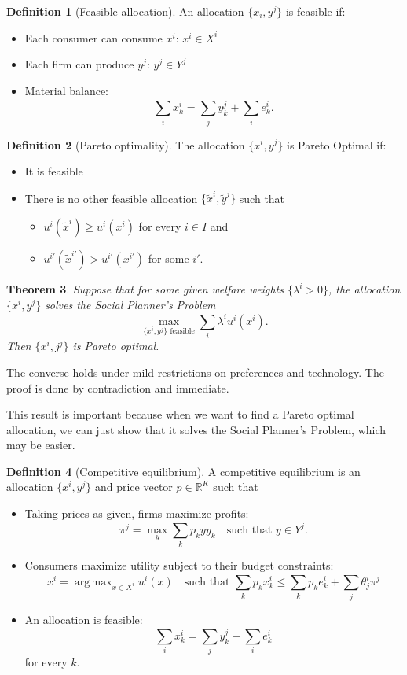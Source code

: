 \documentclass{tufte-handout}
\newcommand*\R{\mathbb{R}}
\DeclareMathOperator*{\argmax}{arg\,max} %
\newtheorem{thm}{Theorem}[subsection]
\theoremstyle{definition}
\newtheorem{defn}[thm]{Definition}
\begin{document}
\begin{defn}[Feasible allocation]
	An allocation $\{x_i, y^j\}$ is feasible if:
	\begin{itemize}
		\item Each consumer can consume $x^i$: $x^i \in X^i$
		\item Each firm can produce $y^j$: $y^j \in Y^j$
		\item Material balance: \[
			\sum\limits_{i}^{} x_k^i = \sum\limits_{j}^{} y_k^j + \sum\limits_{i}^{} e_k^i.
		\] 
	\end{itemize}
\end{defn}

\begin{defn}[Pareto optimality]
	The allocation $\{x^i, y^j\}$ is Pareto Optimal if:
	\begin{itemize}
		\item It is feasible
		\item There is no other feasible allocation $\{\tilde{x}^i, \tilde{y}^j\}$ such that
			\begin{itemize}
				\item $u^i(\tilde{x}^i) \ge u^i(x^i)$ for every $i \in I$ and
				\item $u^{i'}(\tilde{x}^{i'}) > u^{i'}(x^{i'})$ for some $i'$.
			\end{itemize}
	\end{itemize}
\end{defn}

\begin{thm}
	Suppose that for some given welfare weights $\{\lambda^i > 0\}$, the allocation $\{x^i, y^j\}$ solves the Social Planner's Problem \[
		\max_{\{x^i, y^j\} \text{ feasible}} \sum\limits_{i}^{} \lambda^i u^i (x^i)
	.\] Then $\{x^i, j^j\}$ is Pareto optimal.
\end{thm}
The converse holds under mild restrictions on preferences and technology.
The proof is done by contradiction and immediate.

This result is important because when we want to find a Pareto optimal allocation, we can just show that it solves the Social Planner's Problem, which may be easier.

\begin{defn}[Competitive equilibrium]
	A competitive equilibrium is an allocation $\{x^i, y^j\}$ and price vector $p \in \R^K$ such that
	\begin{itemize}
		\item Taking prices as given, firms maximize profits: \[
			\pi^j = \max_{y} \sum\limits_{k}^{} p_ky y_k \quad \text{such that } y \in Y^j
		.\] 
	\item Consumers maximize utility subject to their budget constraints: \[
		x^i = \argmax_{x \in X^i} u^i(x) \quad \text{such that } \sum\limits_{k}^{} p_k x_k^i \le \sum\limits_{k}^{} p_k e_k^i + \sum\limits_{j}^{} \theta^i_j \pi^j \] 
	\item An allocation is feasible: \[
		\sum\limits_{i}^{} x_k^i = \sum\limits_{j}^{} y_k^j + \sum\limits_{i}^{} e_k^i
	\] for every $k$.
	\end{itemize}
\end{defn}
\end{document}
